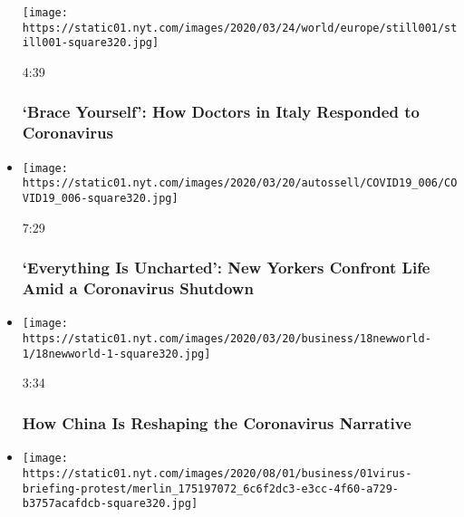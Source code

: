 \begin{itemize}
  \texttt{[image: https://static01.nyt.com/images/2020/03/24/world/europe/still001/still001-square320.jpg]}

  4:39

  \hypertarget{brace-yourself-how-doctors-in-italy-responded-to-coronavirus}{%
  \subsubsection{`Brace Yourself': How Doctors in Italy Responded to
  Coronavirus}\label{brace-yourself-how-doctors-in-italy-responded-to-coronavirus}}
\item
  \href{https://www.nytimes.com/video/nyregion/100000007043833/coronavirus-nyc-shutdown-new-york-city.html?action=click\&module=video-series-bar\&region=header\&pgtype=Article\&playlistId=video/coronavirus-news-update}{}

  \texttt{[image: https://static01.nyt.com/images/2020/03/20/autossell/COVID19\_006/COVID19\_006-square320.jpg]}

  7:29

  \hypertarget{everything-is-uncharted-new-yorkers-confront-life-amid-a-coronavirus-shutdown}{%
  \subsubsection{`Everything Is Uncharted': New Yorkers Confront Life
  Amid a Coronavirus
  Shutdown}\label{everything-is-uncharted-new-yorkers-confront-life-amid-a-coronavirus-shutdown}}
\item
  \href{https://www.nytimes.com/video/world/asia/100000007024807/china-coronavirus-propaganda.html?action=click\&module=video-series-bar\&region=header\&pgtype=Article\&playlistId=video/coronavirus-news-update}{}

  \texttt{[image: https://static01.nyt.com/images/2020/03/20/business/18newworld-1/18newworld-1-square320.jpg]}

  3:34

  \hypertarget{how-china-is-reshaping-the-coronavirus-narrative}{%
  \subsubsection{How China Is Reshaping the Coronavirus
  Narrative}\label{how-china-is-reshaping-the-coronavirus-narrative}}
\item
  \texttt{[image: https://static01.nyt.com/images/2020/08/01/business/01virus-briefing-protest/merlin\_175197072\_6c6f2dc3-e3cc-4f60-a729-b3757acafdcb-square320.jpg]}


\end{itemize}
